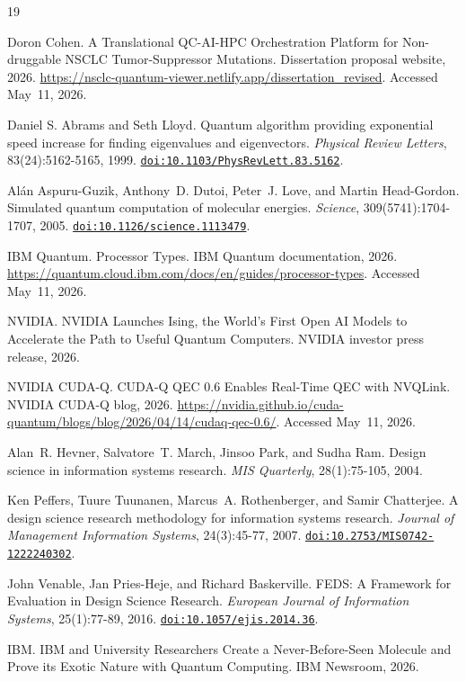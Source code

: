 \documentclass[11pt,letterpaper]{article}
\newcommand{\doi}[1]{\href{https://doi.org/#1}{\texttt{doi:#1}}}
\begin{document}
\begin{thebibliography}{19}

Doron Cohen.
A Translational QC-AI-HPC Orchestration Platform for Non-druggable NSCLC Tumor-Suppressor Mutations.
Dissertation proposal website, 2026.
\url{https://nsclc-quantum-viewer.netlify.app/dissertation_revised}.
Accessed May~11, 2026.

Daniel S. Abrams and Seth Lloyd.
Quantum algorithm providing exponential speed increase for finding eigenvalues and eigenvectors.
\textit{Physical Review Letters}, 83(24):5162-5165, 1999.
\doi{10.1103/PhysRevLett.83.5162}.

Al\'{a}n Aspuru-Guzik, Anthony~D. Dutoi, Peter~J. Love, and Martin Head-Gordon.
Simulated quantum computation of molecular energies.
\textit{Science}, 309(5741):1704-1707, 2005.
\doi{10.1126/science.1113479}.

IBM Quantum.
Processor Types.
IBM Quantum documentation, 2026.
\url{https://quantum.cloud.ibm.com/docs/en/guides/processor-types}.
Accessed May~11, 2026.

NVIDIA.
NVIDIA Launches Ising, the World's First Open AI Models to Accelerate the Path to Useful Quantum Computers.
NVIDIA investor press release, 2026.

NVIDIA CUDA-Q.
CUDA-Q QEC 0.6 Enables Real-Time QEC with NVQLink.
NVIDIA CUDA-Q blog, 2026.
\url{https://nvidia.github.io/cuda-quantum/blogs/blog/2026/04/14/cudaq-qec-0.6/}.
Accessed May~11, 2026.

Alan~R. Hevner, Salvatore~T. March, Jinsoo Park, and Sudha Ram.
Design science in information systems research.
\textit{MIS Quarterly}, 28(1):75-105, 2004.

Ken Peffers, Tuure Tuunanen, Marcus~A. Rothenberger, and Samir Chatterjee.
A design science research methodology for information systems research.
\textit{Journal of Management Information Systems}, 24(3):45-77, 2007.
\doi{10.2753/MIS0742-1222240302}.

John Venable, Jan Pries-Heje, and Richard Baskerville.
FEDS: A Framework for Evaluation in Design Science Research.
\textit{European Journal of Information Systems}, 25(1):77-89, 2016.
\doi{10.1057/ejis.2014.36}.

IBM.
IBM and University Researchers Create a Never-Before-Seen Molecule and Prove its Exotic Nature with Quantum Computing.
IBM Newsroom, 2026.


\end{thebibliography}
\end{document}

